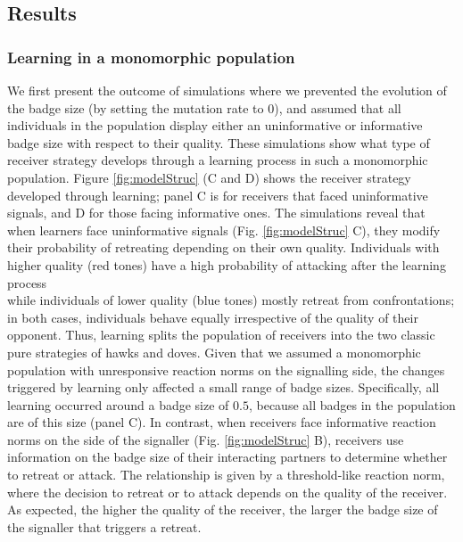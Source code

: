 \documentclass[
  12pt,
]{article}
\begin{document}
\hypertarget{results}{%
\subsection{Results}\label{results}}

\hypertarget{learning-in-a-monomorphic-population}{%
\subsubsection{Learning in a monomorphic
population}\label{learning-in-a-monomorphic-population}}

We first present the outcome of simulations where we prevented the
evolution of the badge size (by setting the mutation rate to \(0\)), and
assumed that all individuals in the population display either an
uninformative or informative badge size with respect to their quality.
These simulations show what type of receiver strategy develops through a
learning process in such a monomorphic population. Figure
\ref{fig:modelStruc} (C and D) shows the receiver strategy developed
through learning; panel C is for receivers that faced uninformative
signals, and D for those facing informative ones. The simulations reveal
that when learners face uninformative signals (Fig. \ref{fig:modelStruc}
C), they modify their probability of retreating depending on their own
quality. Individuals with higher quality (red tones) have a high
probability of attacking after the learning process\\
while individuals of lower quality (blue tones) mostly retreat from
confrontations; in both cases, individuals behave equally irrespective
of the quality of their opponent. Thus, learning splits the population
of receivers into the two classic pure strategies of hawks and doves.
Given that we assumed a monomorphic population with unresponsive
reaction norms on the signalling side, the changes triggered by learning
only affected a small range of badge sizes. Specifically, all learning
occurred around a badge size of \(0.5\), because all badges in the
population are of this size (panel C). In contrast, when receivers face
informative reaction norms on the side of the signaller (Fig.
\ref{fig:modelStruc} B), receivers use information on the badge size of
their interacting partners to determine whether to retreat or attack.
The relationship is given by a threshold-like reaction norm, where the
decision to retreat or to attack depends on the quality of the receiver.
As expected, the higher the quality of the receiver, the larger the
badge size of the signaller that triggers a retreat.
\end{document}
